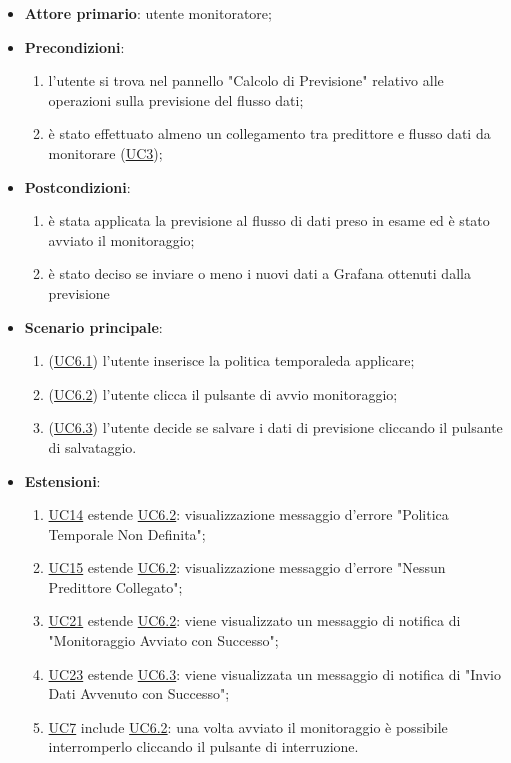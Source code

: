 		\begin{itemize}
			\item\textbf{Attore primario}: utente monitoratore;
			\item\textbf{Precondizioni}:
				\begin{enumerate}
					\item l'utente si trova nel pannello "Calcolo di Previsione" relativo alle operazioni sulla previsione del flusso dati;
					\item è stato effettuato almeno un collegamento tra predittore e flusso dati da monitorare (\hyperref[par:UC3]{UC3});
				\end{enumerate}		
	\item\textbf{Postcondizioni}:
				\begin{enumerate}
					\item è stata applicata la previsione al flusso di dati preso in esame ed è stato avviato il monitoraggio;
					\item è stato deciso se inviare o meno i nuovi dati a Grafana ottenuti dalla previsione
				\end{enumerate}
			\item\textbf{Scenario principale}:
				\begin{enumerate}
					\item (\hyperref[par:UC6.1]{UC6.1}) l'utente inserisce la politica temporale\glo da applicare;
					\item (\hyperref[par:UC6.2]{UC6.2}) l'utente clicca il pulsante di avvio monitoraggio;
					\item (\hyperref[par:UC6.3]{UC6.3}) l'utente decide se salvare i dati di previsione cliccando il pulsante di salvataggio.
				\end{enumerate}
			\item\textbf{Estensioni}:
				\begin{enumerate}
					\item \hyperref[par:UC14]{UC14} estende \hyperref[par:UC6.2]{UC6.2}: visualizzazione messaggio d’errore "Politica Temporale Non Definita";
					\item \hyperref[par:UC15]{UC15} estende \hyperref[par:UC6.2]{UC6.2}: visualizzazione messaggio d’errore "Nessun Predittore Collegato";
					\item \hyperref[par:UC21]{UC21} estende \hyperref[par:UC6.2]{UC6.2}: viene visualizzato un messaggio di notifica di "Monitoraggio Avviato con Successo";
					\item \hyperref[par:UC23]{UC23} estende \hyperref[par:UC6.3]{UC6.3}: viene visualizzata un messaggio di notifica di "Invio Dati Avvenuto con Successo";
					\item \hyperref[par:UC7]{UC7} include \hyperref[par:UC6.2]{UC6.2}: una volta avviato il monitoraggio è possibile interromperlo cliccando il pulsante di interruzione.
				\end{enumerate}
		\end{itemize}

